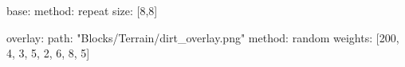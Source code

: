 base:
  method: repeat
  size: [8,8]

overlay:
  path: "Blocks/Terrain/dirt_overlay.png"
  method: random
  weights: [200, 4, 3, 5, 2, 6, 8, 5]
